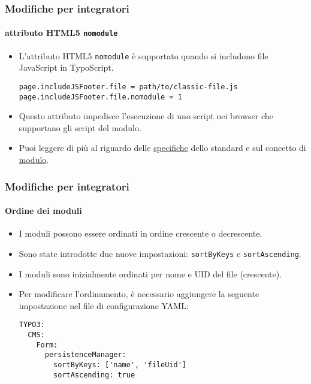 
\begin{frame}[fragile]
	\frametitle{Modifiche per integratori}
	\framesubtitle{attributo HTML5 \texttt{nomodule}}

	\lstset{basicstyle=\tiny\ttfamily}

	\begin{itemize}
		\item L'attributo HTML5 \texttt{nomodule} è supportato quando si includono file JavaScript in TypoScript.
\begin{lstlisting}
page.includeJSFooter.file = path/to/classic-file.js
page.includeJSFooter.file.nomodule = 1
\end{lstlisting}

		\item Questo attributo impedisce l'esecuzione di uno script nei browser che supportano gli script del modulo.

		\item Puoi leggere di più al riguardo delle
			\href{https://html.spec.whatwg.org/multipage/scripting.html#attr-script-nomodule}{specifiche}
			dello standard e sul concetto di
			\href{https://hacks.mozilla.org/2015/08/es6-in-depth-modules/}{modulo}.

	\end{itemize}


\end{frame}


\begin{frame}[fragile]
	\frametitle{Modifiche per integratori}
	\framesubtitle{Ordine dei moduli}

	\lstset{basicstyle=\tiny\ttfamily}

	\begin{itemize}
		\item I moduli possono essere ordinati in ordine crescente o decrescente.
		\item Sono state introdotte due nuove impostazioni: \texttt{sortByKeys} e \texttt{sortAscending}.
		\item I moduli sono inizialmente ordinati per nome e UID del file (crescente).
		\item Per modificare l'ordinamento, è necessario aggiungere la seguente impostazione nel file di configurazione YAML:
\begin{lstlisting}
TYPO3:
  CMS:
    Form:
      persistenceManager:
        sortByKeys: ['name', 'fileUid']
        sortAscending: true
\end{lstlisting}

	\end{itemize}

\end{frame}

